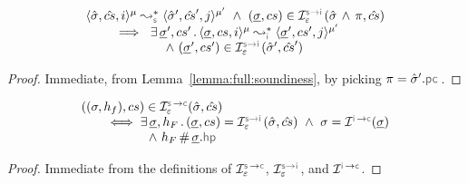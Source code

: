\begin{lemma}
$$
\begin{array}{l}
\transabssemrule{\sstate, \scs, i}{\sstate', \scs', j}{\mode}{\mode'}{\symbolic}  
    \ \wedge \ (\istate, \cs) \in \interpret{\symbinst}{\senv}(\sstate \, \wedge \, \pc, \scs) \\ \quad \quad 
    \ \implies \ \exists \, \istate', \cs' \, . \, 
        \transabssemrule{\istate, \cs, i}{\istate', \cs', j}{\mode}{\mode'}{\instrumented} \\ \quad \quad  \quad \quad \quad \quad 
               \ \wedge \ (\istate', \cs') \in \interpret{\symbinst}{\senv}(\sstate', \scs')
\end{array}
$$
\end{lemma}
\begin{proof}
Immediate, from Lemma~\ref{lemma:full:soundiness}, by picking $\pc = \sstate'.\pcsel$.
\end{proof}

\begin{lemma}\label{lemma:symb:interpretation}
$$
\begin{array}{l}
((\jstate, \heap_f), \cs) \in \interpret{\symbconc}{\senv}(\sstate, \scs) \\ \quad \quad
   \iff 
   \exists \, \istate, h_F \, . \, 
         (\istate, \cs) = \interpret{\symbinst}{\senv}(\sstate, \scs)  
          \ \wedge \   
      \jstate = \interpret{\instconc}{}(\istate) \\ \quad \quad \quad \quad \quad
      \ \wedge \
      h_F \disjoint \istate.\hpsel
\end{array}
$$
\end{lemma}
\begin{proof}
Immediate from the definitions of $\interpret{\symbconc}{\senv}$, $\interpret{\symbinst}{\senv}$, 
and $\interpret{\instconc}{}$. 
\end{proof}


